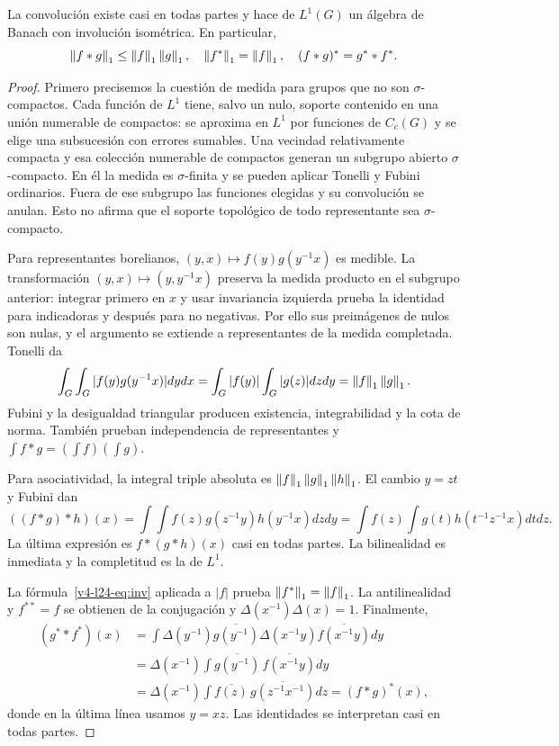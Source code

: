 \begin{teorema}\label{v4:conv-grupo}\label{v4-l24-p:banach}
La convolución existe casi en todas partes y hace de $L^1(G)$ un álgebra de Banach con involución isométrica. En particular,
\[
 \left\lVert f*g\right\rVert_1\leq\left\lVert f\right\rVert_1\left\lVert g\right\rVert_1,\quad
 \left\lVert f^*\right\rVert_1=\left\lVert f\right\rVert_1,\quad
 (f*g)^*=g^**f^*.
\]
\end{teorema}
\begin{proof}
Primero precisemos la cuestión de medida para grupos que no son $\sigma$-compactos. Cada función de $L^1$ tiene, salvo un nulo, soporte contenido en una unión numerable de compactos: se aproxima en $L^1$ por funciones de $C_c(G)$ y se elige una subsucesión con errores sumables. Una vecindad relativamente compacta y esa colección numerable de compactos generan un subgrupo abierto $\sigma$-compacto. En él la medida es $\sigma$-finita y se pueden aplicar Tonelli y Fubini ordinarios. Fuera de ese subgrupo las funciones elegidas y su convolución se anulan. Esto no afirma que el soporte topológico de todo representante sea $\sigma$-compacto.

Para representantes borelianos, $(y,x)\mapsto f(y)g(y^{-1}x)$ es medible. La transformación $(y,x)\mapsto(y,y^{-1}x)$ preserva la medida producto en el subgrupo anterior: integrar primero en $x$ y usar invariancia izquierda prueba la identidad para indicadoras y después para no negativas. Por ello sus preimágenes de nulos son nulas, y el argumento se extiende a representantes de la medida completada. Tonelli da
\[
 \int_G\int_G|f(y)g(y^{-1}x)|dydx
 =\int_G|f(y)|\int_G|g(z)|dzdy=\left\lVert f\right\rVert_1\left\lVert g\right\rVert_1.
\]
Fubini y la desigualdad triangular producen existencia, integrabilidad y la cota de norma. También prueban independencia de representantes y $\int f*g=(\int f)(\int g)$.

Para asociatividad, la integral triple absoluta es $\left\lVert f\right\rVert_1\left\lVert g\right\rVert_1\left\lVert h\right\rVert_1$. El cambio $y=zt$ y Fubini dan
\[
 ((f*g)*h)(x)=\int\int f(z)g(z^{-1}y)h(y^{-1}x)dzdy
 =\int f(z)\int g(t)h(t^{-1}z^{-1}x)dtdz.
\]
La última expresión es $f*(g*h)(x)$ casi en todas partes. La bilinealidad es inmediata y la completitud es la de $L^1$.

La fórmula~\eqref{v4-l24-eq:inv} aplicada a $|f|$ prueba $\left\lVert f^*\right\rVert_1=\left\lVert f\right\rVert_1$. La antilinealidad y $f^{**}=f$ se obtienen de la conjugación y $\Delta(x^{-1})\Delta(x)=1$. Finalmente,
\begin{align*}
 (g^**f^*)(x)
 &=\int\Delta(y^{-1})\overline{g(y^{-1})}\Delta(x^{-1}y)\overline{f(x^{-1}y)}dy\\
 &=\Delta(x^{-1})\int\overline{g(y^{-1})}\,\overline{f(x^{-1}y)}dy\\
 &=\Delta(x^{-1})\int\overline{f(z)}\,\overline{g(z^{-1}x^{-1})}dz=(f*g)^*(x),
\end{align*}
donde en la última línea usamos $y=xz$. Las identidades se interpretan casi en todas partes.
\end{proof}

